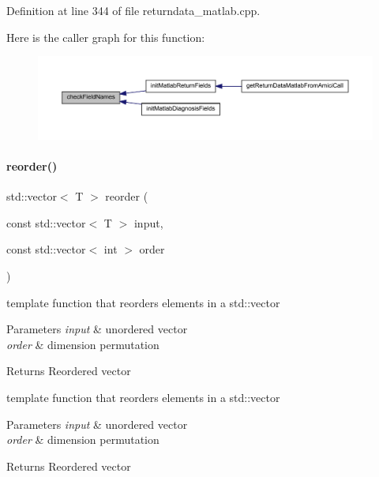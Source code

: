 Definition at line 344 of file returndata\+\_\+matlab.\+cpp.

Here is the caller graph for this function\+:
\nopagebreak
\begin{figure}[H]
\begin{center}
\leavevmode
\includegraphics[width=350pt]{namespaceamici_ad34a0a8f0a3d44e86371a2ecb5841c09_icgraph}
\end{center}
\end{figure}
\mbox{\label{namespaceamici_ac6d55e052cd87c2cbd7a5a26e8d11628}} 
\paragraph{\texorpdfstring{reorder()}{reorder()}}
{\footnotesize\ttfamily std\+::vector$<$ T $>$ reorder (\begin{DoxyParamCaption}\item[{const std\+::vector$<$ T $>$}]{input,  }\item[{const std\+::vector$<$ int $>$}]{order }\end{DoxyParamCaption})}

template function that reorders elements in a std\+::vector


\begin{DoxyParams}{Parameters}
{\em input} & unordered vector \\
\hline
{\em order} & dimension permutation\\
\hline
\end{DoxyParams}
\begin{DoxyReturn}{Returns}
Reordered vector
\end{DoxyReturn}
template function that reorders elements in a std\+::vector


\begin{DoxyParams}{Parameters}
{\em input} & unordered vector \\
\hline
{\em order} & dimension permutation\\
\hline
\end{DoxyParams}
\begin{DoxyReturn}{Returns}
Reordered vector
\end{DoxyReturn}


